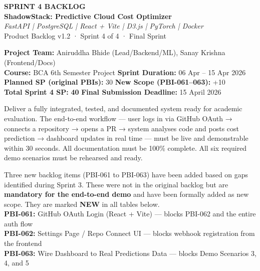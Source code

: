 \documentclass[10pt,a4paper]{article}
\newcommand{\New}{\textcolor{warning}{\textbf{NEW}}}
\begin{document}
\begin{tcolorbox}[colback=primary, colframe=primary, arc=4pt, text fill]
  \centering\color{white}\vspace{0.5em}
  {\LARGE\bfseries SPRINT 4 BACKLOG}\\[0.4em]
  {\Large\bfseries ShadowStack: Predictive Cloud Cost Optimizer}\\[0.4em]
  \textit{FastAPI \;|\; PostgreSQL \;|\; React + Vite \;|\; D3.js \;|\; PyTorch \;|\; Docker}\\[0.3em]
  {\normalsize Product Backlog v1.2 · Sprint 4 of 4 · Final Sprint}
  \vspace{0.4em}
\end{tcolorbox}

\vspace{0.5em}
\noindent
\textbf{Project Team:} Aniruddha Bhide (Lead/Backend/ML), Sanay Krishna (Frontend/Docs)\\
\textbf{Course:} BCA 6th Semester Project
\hfill\textbf{Sprint Duration:} 06 Apr – 15 Apr 2026\\
\textbf{Planned SP (original PBIs):} 30
\hfill\textbf{New Scope (PBI-061–063):} +10\\
\textbf{Total Sprint 4 SP:} \textbf{40}
\hfill\textbf{Final Submission Deadline:} 15 April 2026

\vspace{0.8em}

\begin{highlightbox}
Deliver a fully integrated, tested, and documented system ready for academic evaluation. The end-to-end workflow — user logs in via GitHub OAuth → connects a repository → opens a PR → system analyses code and posts cost prediction → dashboard updates in real time — must be live and demonstrable within 30 seconds. All documentation must be 100\% complete. All six required demo scenarios must be rehearsed and ready.
\end{highlightbox}

\vspace{0.4em}
\begin{warnbox}
Three new backlog items (PBI-061 to PBI-063) have been added based on gaps identified during Sprint 3. These were not in the original backlog but are \textbf{mandatory for the end-to-end demo} and have been formally added as new scope. They are marked \New{} in all tables below.\\[0.3em]
\textbf{PBI-061:} GitHub OAuth Login (React + Vite) — blocks PBI-062 and the entire auth flow\\
\textbf{PBI-062:} Settings Page / Repo Connect UI — blocks webhook registration from the frontend\\
\textbf{PBI-063:} Wire Dashboard to Real Predictions Data — blocks Demo Scenarios 3, 4, and 5
\end{warnbox}
\end{document}
